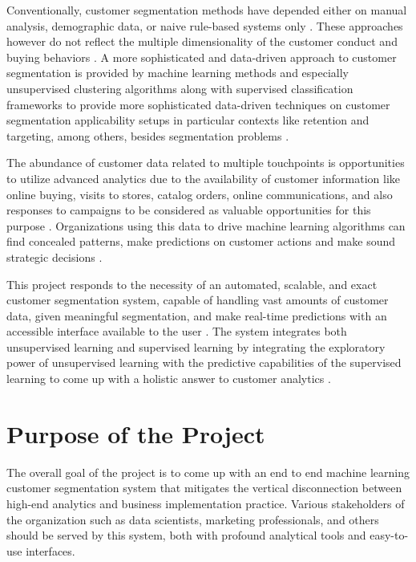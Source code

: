 \documentclass[12pt,a4paper]{report}
\begin{document}
\noindent
Conventionally, customer segmentation methods have depended either on manual analysis, demographic data, or naive rule-based systems only \cite{plummer1974}. These approaches however do not reflect the multiple dimensionality of the customer conduct and buying behaviors \cite{wind1978}. A more sophisticated and data-driven approach to customer segmentation is provided by machine learning methods and especially unsupervised clustering algorithms along with supervised classification frameworks to provide more sophisticated data-driven techniques on customer segmentation applicability setups in particular contexts like retention and targeting, among others, besides segmentation problems \cite{hastie2009, tsiptsis2009}.

\noindent
The abundance of customer data related to multiple touchpoints is opportunities to utilize advanced analytics due to the availability of customer information like online buying, visits to stores, catalog orders, online communications, and also responses to campaigns to be considered as valuable opportunities for this purpose \cite{moe2003}. Organizations using this data to drive machine learning algorithms can find concealed patterns, make predictions on customer actions and make sound strategic decisions \cite{kumar2006, provost2013}.

\noindent
This project responds to the necessity of an automated, scalable, and exact customer segmentation system, capable of handling vast amounts of customer data, given meaningful segmentation, and make real-time predictions with an accessible interface available to the user \cite{berry2004}. The system integrates both unsupervised learning and supervised learning by integrating the exploratory power of unsupervised learning with the predictive capabilities of the supervised learning to come up with a holistic answer to customer analytics \cite{kumar2006, tan2006}.

\section{Purpose of the Project}
The overall goal of the project is to come up with an end to end machine learning customer segmentation system that mitigates the vertical disconnection between high-end analytics and business implementation practice. Various stakeholders of the organization such as data scientists, marketing professionals, and others should be served by this system, both with profound analytical tools and easy-to-use interfaces.
\end{document}
